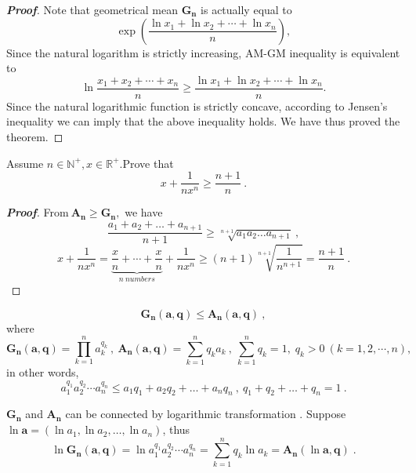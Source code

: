 \documentclass{memoir}
\begin{document}
\begin{proof}[\textbf{Proof}]
	Note that geometrical mean $\boldsymbol{G_n}$ is actually equal to 
	\[ \exp \left(\frac{\ln x_{1}+\ln x_{2}+\cdots +\ln x_{n}}{n} \right),\]
	Since the natural logarithm is strictly increasing, AM-GM inequality is equivalent to
	\[\ln \frac{x_{1}+x_{2}+\cdots +x_{n}}{n} \geqslant \frac{\ln x_{1}+\ln x_{2}+\cdots +\ln x_{n}}{n} .\]
	Since the natural logarithmic function is strictly concave, according to Jensen's inequality we can imply that the above inequality holds. We have thus proved the theorem.
	
\end{proof}
\par \; 
\begin{example}
	
	Assume $n\in\mathbb{N}^+,x\in\mathbb{R}^+$.Prove that
	\[x+\frac{1}{nx^n}\geqslant\frac{n+1}{n}\ .\]
	
\end{example}

\begin{proof}[\textbf{Proof}]
	From$\ \boldsymbol{A_n}\geqslant \boldsymbol{G_n}, $ we have
	\[\frac{a_1+a_2+\dots+a_{n+1}}{n+1}\geqslant\sqrt[n+1]{a_1a_2\dots a_{n+1}}\  ,\]
	\[x+\frac{1}{nx^n}=\underbrace{\frac{x}{n}+\cdots +\frac{x}{n}}_{n\ numbers}+\frac{1}{nx^n}
	\geqslant (n+1)\sqrt[n+1]{\frac{1}{n^{n+1}}}
	=\frac{n+1}{n}\ . \]
\end{proof}

\par  \; \par  \; 

\begin{theorem}
	
	\begin{equation}
	\boldsymbol{G_n}(\mathbf{a},\mathbf{q})\leqslant \boldsymbol{A_n}(\mathbf{a},\mathbf{q})\ ,
	\end{equation}
	where
	\[\boldsymbol{G_n}(\mathbf{a},\mathbf{q})=\prod_{k=1}^{n} a_k^{q_k}\ ,\ 
	\boldsymbol{A_n}(\mathbf{a},\mathbf{q})=\sum_{k=1}^{n} q_k a_k\ ,\ 
	 \sum_{k=1}^{n} q_k =1,\;q_k>0\ (k=1,2,\cdots,n)  ,\]
	in other words,
	\[a_1^{q_1} a_2^{q_2}\cdots a_n^{q_n}
	\leqslant a_1q_1+a_2q_2+\dots +a_nq_n
	\ ,\ q_1+q_2+\dots +q_n=1
	\ .\]
	
\end{theorem}
$\boldsymbol{G_n}$ and $\boldsymbol{A_n}$ can be connected by logarithmic transformation . 
Suppose $\ln \mathbf{a}=(\ln a_1,\ln a_2,\dots ,\ln a_n)$,
thus \[\ln \boldsymbol{G_n}(\mathbf{a},\mathbf{q})=\ln a_1^{q_1} a_2^{q_2}
\cdots a_n^{q_n}=\sum_{k=1}^n q_k \ln a_k=\boldsymbol{A_n}(\ln \mathbf{a},\mathbf{q})\;.\]
\end{document}
